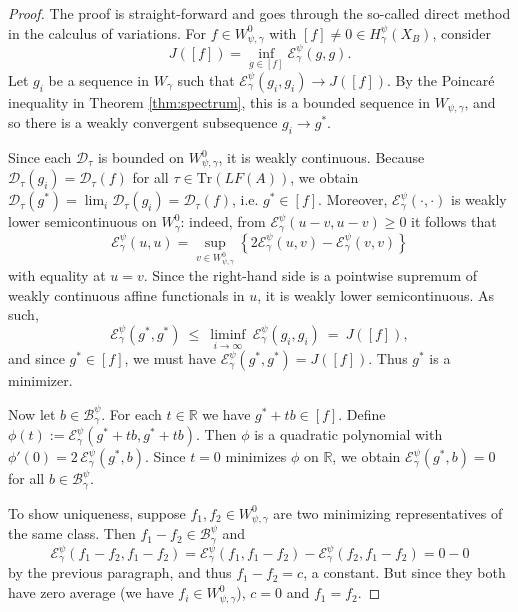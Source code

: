 \documentclass[12pt]{amsart}
\theoremstyle{plain}
\theoremstyle{definition}
\begin{document}
\begin{proof}
The proof is straight-forward and goes through the so-called direct method in the calculus of variations. For $f\in W_{\psi,\gamma}^0 $ with $[f]\neq 0 \in H^\psi_\gamma(X_B)$, consider
$$J([f]) = \inf_{g\in [f]}\mathcal{E}^\psi_\gamma (g,g).$$
Let $g_i$ be a sequence in $W_\gamma$ such that $\mathcal{E}^\psi_\gamma  (g_i,g_i)\rightarrow J([f])$. By the Poincar\'e inequality in Theorem \ref{thm:spectrum}, this is a bounded sequence in $W_{\psi,\gamma}$, and so there is a weakly convergent subsequence $g_i\rightarrow g^*$.

Since each $\mathcal{D}_\tau$ is bounded on $W^0_{\psi,\gamma}$, it is weakly continuous. Because $\mathcal{D}_\tau(g_i)=\mathcal{D}_\tau(f)$ for all $\tau \in \mathrm{Tr}(LF(A))$, we obtain $\mathcal{D}_\tau(g^*)=\lim_i \mathcal{D}_\tau(g_i)=\mathcal{D}_\tau(f)$, i.e. $g^*\in [f]$.
Moreover, $\mathcal{E}^\psi_\gamma (\cdot,\cdot)$ is weakly lower semicontinuous on $W_\gamma^0 $: indeed, from $\mathcal{E}^\psi_\gamma(u-v,u-v)\geq 0$ it follows that
$$\mathcal{E}^\psi_\gamma(u,u) = \sup_{v\in W_{\psi,\gamma}^0}\left\{ 2\mathcal{E}^\psi_\gamma(u,v) - \mathcal{E}^\psi_\gamma(v,v)\right\}$$
with equality at $u=v$. Since the right-hand side is a pointwise supremum of weakly continuous affine functionals in $u$, it is weakly lower semicontinuous. As such,
$$ \mathcal{E}^\psi_\gamma (g^*,g^*)\ \le\ \liminf_{i\to\infty}\ \mathcal{E}^\psi_\gamma (g_i,g_i)\ =\ J([f]),
$$
and since $g^*\in [f]$, we must have $\mathcal{E}^\psi_\gamma (g^*,g^*)=J([f])$.
Thus $g^*$ is a minimizer.

Now let $b\in\mathcal{B}^\psi_\gamma$. For each $t\in\mathbb{R}$ we have $g^*+t b\in [f]$.
Define $\phi(t):=\mathcal{E}^\psi_\gamma (g^*+t b,g^*+t b)$.
Then $\phi$ is a quadratic polynomial with $\phi'(0)=2\,\mathcal{E}^\psi_\gamma (g^*,b)$.
Since $t=0$ minimizes $\phi$ on $\mathbb{R}$, we obtain $\mathcal{E}^\psi_\gamma (g^*,b)=0$ for all $b\in\mathcal{B}^\psi_\gamma$. 

To show uniqueness, suppose $f_1,f_2\in W^0_{\psi,\gamma}$ are two minimizing representatives of the same class. Then $f_1-f_2 \in\mathcal{B}_\gamma^\psi$ and
$$\mathcal{E}^\psi _\gamma(f_1-f_2,f_1-f_2) = \mathcal{E}^\psi _\gamma(f_1,f_1-f_2) - \mathcal{E}^\psi _\gamma(f_2,f_1-f_2) = 0-0$$
 by the previous paragraph, and thus $f_1 - f_2  =  c$, a constant. But since they both have zero average (we have $f_i\in W^0_{\psi,\gamma}$), $c = 0$ and $f_1 = f_2$. 
\end{proof}
\end{document}

